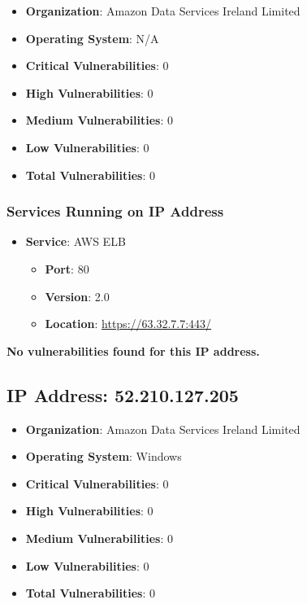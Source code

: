 \documentclass{article}
\begin{document}
\begin{itemize}
    \item \textbf{Organization}: Amazon Data Services Ireland Limited
    \item \textbf{Operating System}:  N/A 
    \item \textbf{Critical Vulnerabilities}: 0
    \item \textbf{High Vulnerabilities}: 0
    \item \textbf{Medium Vulnerabilities}: 0
    \item \textbf{Low Vulnerabilities}: 0
    \item \textbf{Total Vulnerabilities}: 0
\end{itemize}

\subsubsection*{Services Running on IP Address}

\begin{itemize}
    
        \item \textbf{Service}: AWS ELB
        \begin{itemize}
            \item \textbf{Port}: 80
            \item \textbf{Version}:  2.0 
            \item \textbf{Location}: \href{ https://63.32.7.7:443/ }{ https://63.32.7.7:443/ }
        \end{itemize}
    
\end{itemize}


\textbf{No vulnerabilities found for this IP address.}




\clearpage



\subsection*{IP Address: 52.210.127.205}

\begin{itemize}
    \item \textbf{Organization}: Amazon Data Services Ireland Limited
    \item \textbf{Operating System}:  Windows 
    \item \textbf{Critical Vulnerabilities}: 0
    \item \textbf{High Vulnerabilities}: 0
    \item \textbf{Medium Vulnerabilities}: 0
    \item \textbf{Low Vulnerabilities}: 0
    \item \textbf{Total Vulnerabilities}: 0
\end{itemize}
\end{document}
